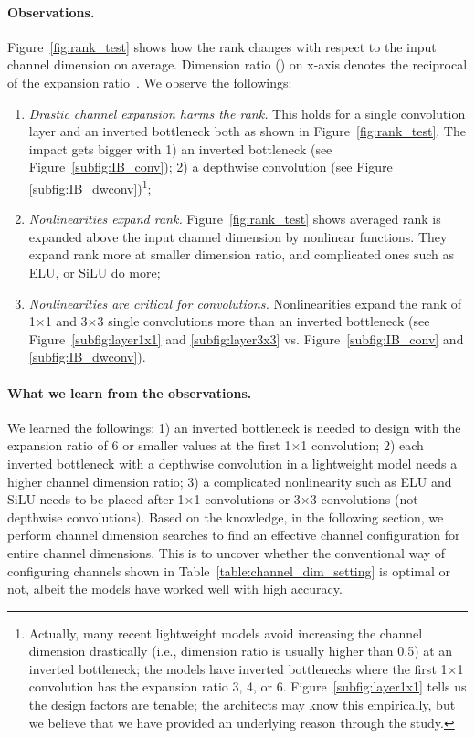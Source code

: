 \vspace{-4mm}
\paragraph{Observations.} Figure~\ref{fig:rank_test} shows how the rank changes with respect to the input channel dimension on average. Dimension ratio () on x-axis denotes the reciprocal of the expansion ratio~\cite{mobilenetv2}. We observe the followings: 
\vspace{-2mm}
\begin{enumerate}[label=(\roman*)]
    \item {\it Drastic channel expansion harms the rank.} This holds for a single convolution layer and an inverted bottleneck both as shown in Figure~\ref{fig:rank_test}. The impact gets bigger with 1) an inverted bottleneck (see Figure~\ref{subfig:IB_conv}); 2) a depthwise convolution (see Figure \ref{subfig:IB_dwconv})\footnote{Actually, many recent lightweight models avoid increasing the channel dimension drastically (i.e., dimension ratio is usually higher than 0.5) at an inverted bottleneck; the models have inverted bottlenecks where the first 1×1 convolution has the expansion ratio 3, 4, or 6. Figure~\ref{subfig:layer1x1} tells us the design factors are tenable; the architects may know this empirically, but we believe that we have provided an underlying reason through the study.};
    \vspace{-2mm}
    \item {\it Nonlinearities expand rank.} Figure~\ref{fig:rank_test} shows averaged rank is expanded above the input channel dimension by nonlinear functions. They expand rank more at smaller dimension ratio, and complicated ones such as ELU, or SiLU do more;
    \vspace{-2mm}
    \item {\it Nonlinearities are critical for convolutions.} Nonlinearities expand the rank of 1×1 and 3×3 single convolutions more than an inverted bottleneck (see Figure~\ref{subfig:layer1x1} and \ref{subfig:layer3x3} vs. Figure~\ref{subfig:IB_conv} and \ref{subfig:IB_dwconv}). \vspace{-4mm}
\end{enumerate}

\paragraph{What we learn from the observations.}
We learned the followings: 1) an inverted bottleneck is needed to design with the expansion ratio of 6 or smaller values at the first 1×1 convolution; 2) each inverted bottleneck with a depthwise convolution in a lightweight model needs a higher channel dimension ratio; 3) a complicated nonlinearity such as ELU and SiLU needs to be placed after 1×1 convolutions or 3×3 convolutions (not depthwise convolutions). Based on the knowledge, in the following section, we perform channel dimension searches to find an effective channel configuration for entire channel dimensions. This is to uncover whether the conventional way of configuring channels shown in Table~\ref{table:channel_dim_setting} is optimal or not, albeit the models have worked well with high accuracy. 



